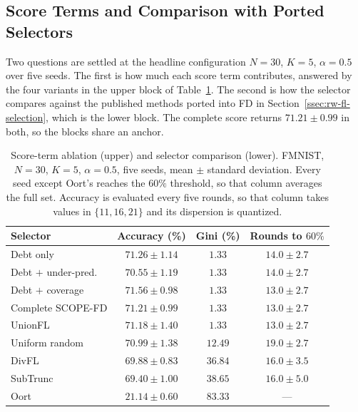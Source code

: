 \documentclass[journal]{IEEEtran}
\newcommand{\rev}[1]{{\color{blue}#1}}
\begin{document}
\subsection{Score Terms and Comparison with Ported Selectors}
\label{ssec:exp-ablation}

\rev{Two questions are settled at the headline configuration $N=30$, $K=5$, $\alpha=0.5$ over five seeds. The first is how much each score term contributes, answered by the four variants in the upper block of Table~\ref{tab:headline}. The second is how the selector compares against the published methods ported into FD in Section~\ref{ssec:rw-fl-selection}, which is the lower block. The complete score returns $71.21 \pm 0.99$ in both, so the blocks share an anchor.}

\begin{table}[t]
\centering
\caption{\rev{Score-term ablation (upper) and selector comparison (lower). FMNIST, $N=30$, $K=5$, $\alpha=0.5$, five seeds, mean $\pm$ standard deviation. Every seed except Oort's reaches the $60\%$ threshold, so that column averages the full set. Accuracy is evaluated every five rounds, so that column takes values in $\{11,16,21\}$ and its dispersion is quantized.}}
\label{tab:headline}
\renewcommand{\arraystretch}{1.0}
\footnotesize
\setlength{\tabcolsep}{4pt}
\begin{tabular}{@{}lccc@{}}
\toprule
\textbf{Selector} & \textbf{Accuracy (\%)} & \textbf{Gini (\%)} & \textbf{Rounds to $60\%$} \\
\midrule
Debt only              & $71.26 \pm 1.14$ & $1.33$  & $14.0 \pm 2.7$ \\
Debt $+$ under-pred.   & $70.55 \pm 1.19$ & $1.33$  & $14.0 \pm 2.7$ \\
Debt $+$ coverage      & $71.56 \pm 0.98$ & $1.33$  & $13.0 \pm 2.7$ \\
Complete SCOPE-FD      & $71.21 \pm 0.99$ & $1.33$  & $13.0 \pm 2.7$ \\
\midrule
UnionFL \cite{castillo2024unionfl}  & $71.18 \pm 1.40$ & $1.33$  & $13.0 \pm 2.7$ \\
Uniform random      & $70.99 \pm 1.38$ & $12.49$ & $19.0 \pm 2.7$ \\
DivFL \cite{balakrishnan2022divfl}   & $69.88 \pm 0.83$ & $36.84$ & $16.0 \pm 3.5$ \\
SubTrunc \cite{castillo2024subtrunc} & $69.40 \pm 1.00$ & $38.65$ & $16.0 \pm 5.0$ \\
Oort \cite{lai2021oort}              & $21.14 \pm 0.60$ & $83.33$ & --- \\
\bottomrule
\end{tabular}
\end{table}
\end{document}
